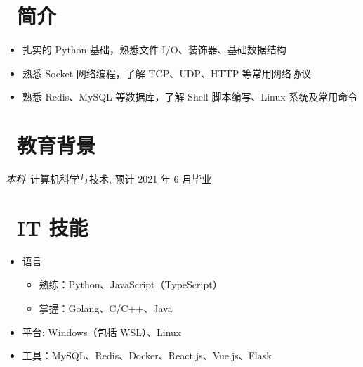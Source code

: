 \documentclass{resume}
\begin{document}



\section{\faUser\ 简介}
\begin{itemize}[parsep=0.5ex]
  \item 扎实的 Python 基础，熟悉文件 I/O、装饰器、基础数据结构 
  \item 熟悉 Socket 网络编程，了解 TCP、UDP、HTTP 等常用网络协议
  \item 熟悉 Redis、MySQL 等数据库，了解 Shell 脚本编写、Linux 系统及常用命令
\end{itemize}

\section{\faGraduationCap\  教育背景}
\textit{本科}\ 计算机科学与技术, 预计 2021 年 6 月毕业

\section{\faCogs\ IT 技能}
\begin{itemize}[parsep=0.5ex]
  \item 语言
  \begin{itemize}
    \item 熟练：Python、JavaScript（TypeScript）
    \item 掌握：Golang、C/C++、Java
  \end{itemize}
  \item 平台: Windows（包括 WSL）、Linux
  \item 工具：MySQL、Redis、Docker、React.js、Vue.js、Flask
\end{itemize}
\end{document}
